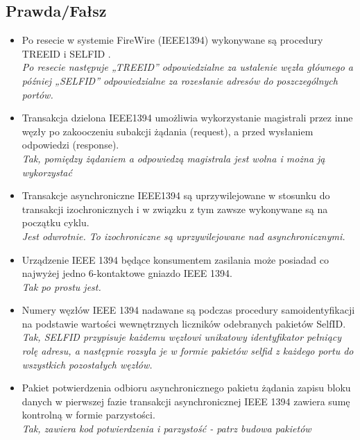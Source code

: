 \documentclass[a4paper,twoside]{article}
\begin{document}
\subsection*{Prawda/Fałsz}
\begin{itemize}
	
	\item \textcolor{tak}{Po resecie w systemie FireWire (IEEE1394) wykonywane są procedury TREEID  i SELFID .} \\
	{\small \emph{Po resecie następuje „TREEID” odpowiedzialne za ustalenie węzła głównego a później „SELFID” odpowiedzialne za rozesłanie adresów do poszczególnych portów.}}
	
	\item \textcolor{tak}{Transakcja dzielona IEEE1394 umożliwia wykorzystanie magistrali przez inne węzły po zakooczeniu subakcji żądania (request), a przed wysłaniem odpowiedzi (response).} \\
	{\small \emph{Tak, pomiędzy żądaniem a odpowiedzą magistrala jest wolna i można ją wykorzystać}}
	
	\item \textcolor{nie}{Transakcje asynchroniczne IEEE1394 są uprzywilejowane w stosunku do transakcji izochronicznych i w związku z tym zawsze wykonywane są na początku cyklu.} \\
	{\small \emph{Jest odwrotnie. To izochroniczne są uprzywilejowane nad asynchronicznymi.}}
	
	\item \textcolor{tak}{Urządzenie IEEE 1394 będące konsumentem zasilania może posiadad co najwyżej jedno 6-kontaktowe gniazdo IEEE 1394.} \\
	{\small \emph{Tak po prostu jest.}}
	
	\item \textcolor{tak}{Numery węzłów IEEE 1394 nadawane są podczas procedury samoidentyfikacji na podstawie wartości wewnętrznych liczników odebranych pakietów SelfID.} \\
	{\small \emph{Tak, SELFID przypisuje każdemu węzłowi unikatowy identyfikator pełniący rolę adresu, a następnie rozsyła je w formie pakietów selfid z każdego portu do wszystkich pozostałych węzłów.}}
	
	\item \textcolor{tak}{Pakiet potwierdzenia odbioru asynchronicznego pakietu żądania zapisu bloku danych w pierwszej fazie transakcji asynchronicznej IEEE 1394 zawiera sumę kontrolną w formie parzystości.} \\
	{\small \emph{Tak, zawiera kod potwierdzenia i parzystość - patrz budowa pakietów}}
	

\end{itemize}
\end{document}
